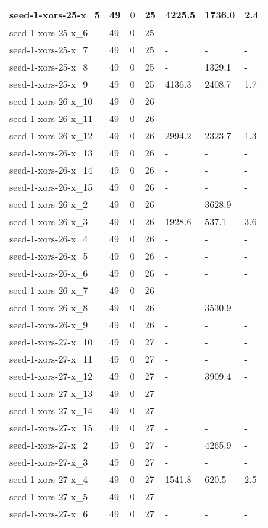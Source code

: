\begin{scriptsize}
\begin{longtable}{|p{5cm}|l|l|l|l|l|l|}
seed-1-xors-25-x\_5&49&0&25&4225.5&1736.0&2.4 \\ \hline 
seed-1-xors-25-x\_6&49&0&25&-&-&- \\ \hline 
seed-1-xors-25-x\_7&49&0&25&-&-&- \\ \hline 
seed-1-xors-25-x\_8&49&0&25&-&1329.1&- \\ \hline 
seed-1-xors-25-x\_9&49&0&25&4136.3&2408.7&1.7 \\ \hline 
seed-1-xors-26-x\_10&49&0&26&-&-&- \\ \hline 
seed-1-xors-26-x\_11&49&0&26&-&-&- \\ \hline 
seed-1-xors-26-x\_12&49&0&26&2994.2&2323.7&1.3 \\ \hline 
seed-1-xors-26-x\_13&49&0&26&-&-&- \\ \hline 
seed-1-xors-26-x\_14&49&0&26&-&-&- \\ \hline 
seed-1-xors-26-x\_15&49&0&26&-&-&- \\ \hline 
seed-1-xors-26-x\_2&49&0&26&-&3628.9&- \\ \hline 
seed-1-xors-26-x\_3&49&0&26&1928.6&537.1&3.6 \\ \hline 
seed-1-xors-26-x\_4&49&0&26&-&-&- \\ \hline 
seed-1-xors-26-x\_5&49&0&26&-&-&- \\ \hline 
seed-1-xors-26-x\_6&49&0&26&-&-&- \\ \hline 
seed-1-xors-26-x\_7&49&0&26&-&-&- \\ \hline 
seed-1-xors-26-x\_8&49&0&26&-&3530.9&- \\ \hline 
seed-1-xors-26-x\_9&49&0&26&-&-&- \\ \hline 
seed-1-xors-27-x\_10&49&0&27&-&-&- \\ \hline 
seed-1-xors-27-x\_11&49&0&27&-&-&- \\ \hline 
seed-1-xors-27-x\_12&49&0&27&-&3909.4&- \\ \hline 
seed-1-xors-27-x\_13&49&0&27&-&-&- \\ \hline 
seed-1-xors-27-x\_14&49&0&27&-&-&- \\ \hline 
seed-1-xors-27-x\_15&49&0&27&-&-&- \\ \hline 
seed-1-xors-27-x\_2&49&0&27&-&4265.9&- \\ \hline 
seed-1-xors-27-x\_3&49&0&27&-&-&- \\ \hline 
seed-1-xors-27-x\_4&49&0&27&1541.8&620.5&2.5 \\ \hline 
seed-1-xors-27-x\_5&49&0&27&-&-&- \\ \hline 
seed-1-xors-27-x\_6&49&0&27&-&-&- \\ \hline 

\end{longtable}
\end{scriptsize}
